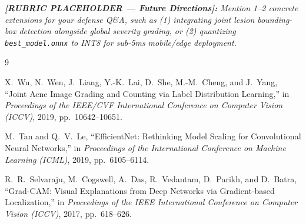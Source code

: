 \documentclass[11pt,a4paper]{article}
\begin{document}
\medskip
\noindent
\textit{\textbf{[RUBRIC PLACEHOLDER --- Future Directions]:} Mention 1--2 concrete extensions for your defense Q\&A, such as (1) integrating joint lesion bounding-box detection alongside global severity grading, or (2) quantizing \texttt{best\_model.onnx} to INT8 for sub-5ms mobile/edge deployment.}

\begin{thebibliography}{9}

X.~Wu, N.~Wen, J.~Liang, Y.-K.~Lai, D.~She, M.-M.~Cheng, and J.~Yang,
``Joint Acne Image Grading and Counting via Label Distribution Learning,''
in \emph{Proceedings of the IEEE/CVF International Conference on Computer Vision (ICCV)}, 2019, pp.~10642--10651.

M.~Tan and Q.~V.~Le,
``EfficientNet: Rethinking Model Scaling for Convolutional Neural Networks,''
in \emph{Proceedings of the International Conference on Machine Learning (ICML)}, 2019, pp.~6105--6114.

R.~R.~Selvaraju, M.~Cogswell, A.~Das, R.~Vedantam, D.~Parikh, and D.~Batra,
``Grad-CAM: Visual Explanations from Deep Networks via Gradient-based Localization,''
in \emph{Proceedings of the IEEE International Conference on Computer Vision (ICCV)}, 2017, pp.~618--626.

\end{thebibliography}
\end{document}
